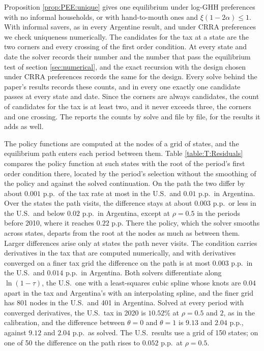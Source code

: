 

Proposition \ref{prop:PEE:unique} gives one equilibrium under log-GHH preferences with no informal households, or with hand-to-mouth ones and $\xi(1-2\alpha) \leq 1$. With informal savers, as in every Argentine result, and under CRRA preferences we check uniqueness numerically. The candidates for the tax at a state are the two corners and every crossing of the first order condition. At every state and date the solver records their number and the number that pass the equilibrium test of section \ref{sec:numerical}, and the exact recursion with the design chosen under CRRA preferences records the same for the design. Every solve behind the paper's results records these counts, and in every one exactly one candidate passes at every state and date. Since the corners are always candidates, the count of candidates for the tax is at least two, and it never exceeds three, the corners and one crossing. The  reports the counts by solve and file by file, for the results it adds as well.

The policy functions are computed at the nodes of a grid of states, and the equilibrium path enters each period between them. Table \ref{table:T:Residuals} compares the policy function at such states with the root of the period's first order condition there, located by the period's selection without the smoothing of the policy and against the solved continuation. On the path the two differ by about $0.001$ p.p.\ of the tax rate at most in the U.S.\ and $0.01$ p.p.\ in Argentina. Over the states the path visits, the difference stays at about $0.003$ p.p.\ or less in the U.S.\ and below $0.02$ p.p.\ in Argentina, except at $\rho = 0.5$ in the periods before 2010, where it reaches $0.22$ p.p. There the policy, which the solver smooths across states, departs from the root at the nodes as much as between them. Larger differences arise only at states the path never visits. The condition carries derivatives in the tax that are computed numerically, and with derivatives converged on a finer tax grid the difference on the path is at most $0.003$ p.p.\ in the U.S.\ and $0.014$ p.p.\ in Argentina. Both solvers differentiate along $\ln(1-\tau)$, the U.S.\ one with a least-squares cubic spline whose knots are $0.04$ apart in the tax and Argentina's with an interpolating spline, and the finer grid has 801 nodes in the U.S.\ and 401 in Argentina. Solved at every period with converged derivatives, the U.S.\ tax in 2020 is $10.52\%$ at $\rho = 0.5$ and $2$, as in the calibration, and the difference between $\theta = 0$ and $\theta = 1$ is $9.13$ and $2.04$ p.p., against $9.12$ and $2.04$ p.p.\ as solved. The U.S.\ results use a grid of 150 states; on one of 50 the difference on the path rises to $0.052$ p.p.\ at $\rho = 0.5$.


\FloatBarrier
